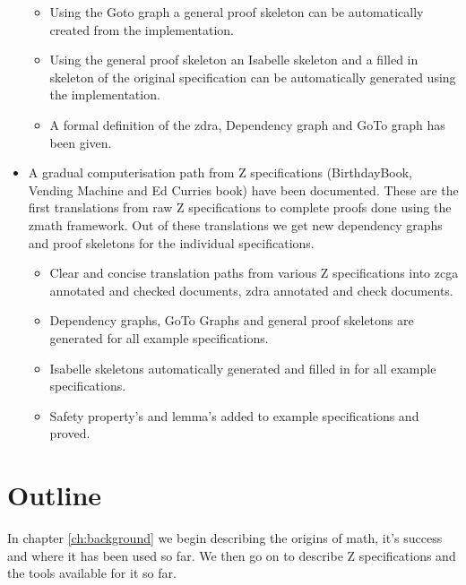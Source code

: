 \begin{itemize}
\begin{itemize}

\item Using the Goto graph a general proof skeleton can be automatically created from the implementation.

\item Using the general proof skeleton an Isabelle skeleton and a filled in skeleton of the original specification can be automatically generated using the implementation.

\item A formal definition of the \gls{zdra}, Dependency graph and GoTo graph has been given.
\end{itemize}

\item A gradual computerisation path from Z specifications (BirthdayBook, Vending Machine and Ed Curries book) have been documented. These are the first translations from raw Z specifications to complete proofs done using the \gls{zmath} framework. Out of these translations we get new dependency graphs and proof skeletons for the individual specifications.

\begin{itemize}
\item Clear and concise translation paths from various Z specifications into \gls{zcga} annotated and checked documents, \gls{zdra} annotated and check documents.

\item Dependency graphs, GoTo Graphs and general proof skeletons are generated for all example specifications.

\item Isabelle skeletons automatically generated and filled in for all example specifications.

\item Safety property's and lemma's added to example specifications and proved.
\end{itemize}

\end{itemize}

\section{Outline}

In chapter \ref{ch:background} we begin describing the origins of \gls{math}, it's success and where it has been used so far. We then go on to describe Z specifications and the tools available for it so far.

